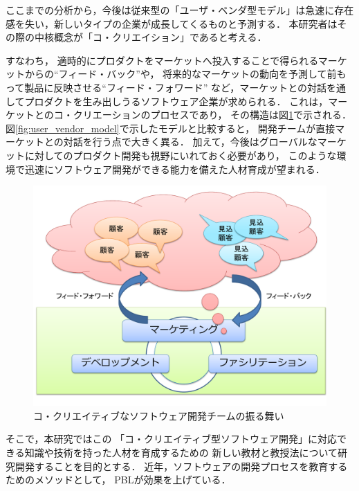 \documentclass[a4j,9pt,twocolumn,twoside]{jsarticle}
\begin{document}
    ここまでの分析から，今後は従来型の「ユーザ・ベンダ型モデル」は急速に存在感を失い，新しいタイプの企業が成長してくるものと予測する．
    本研究者はその際の中核概念が「コ・クリエイション」であると考える．
    
    すなわち，
    適時的にプロダクトをマーケットへ投入することで得られるマーケットからの``フィード・バック''や，
    将来的なマーケットの動向を予測して前もって製品に反映させる``フィード・フォワード''
    など，マーケットとの対話を通してプロダクトを生み出しうるソフトウェア企業が求められる．
    これは，マーケットとのコ・クリエーションのプロセスであり，
    その構造は図\ref{fig:CcSD}で示される．
    図\ref{fig:user_vendor_model}で示したモデルと比較すると，
    開発チームが直接マーケットとの対話を行う点で大きく異る．
    加えて，今後はグローバルなマーケットに対してのプロダクト開発も視野にいれておく必要があり，
    このような環境で迅速にソフトウェア開発ができる能力を備えた人材育成が望まれる．
    
\begin{figure}
\begin{center}
\includegraphics[width=0.9\linewidth]{figs/CcSD.pdf}
\caption{コ・クリエイティブなソフトウェア開発チームの振る舞い}
\label{fig:CcSD}
\end{center}
\end{figure}
    
    そこで，本研究ではこの
    「コ・クリエイティブ型ソフトウェア開発」に対応できる知識や技術を持った人材を育成するための
    新しい教材と教授法について研究開発することを目的とする．
    近年，ソフトウェアの開発プロセスを教育するためのメソッドとして，
    PBLが効果を上げている\cite{pub:matsuzawa-2008}．
    
\end{document}
